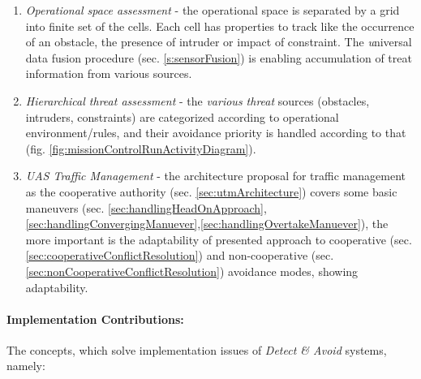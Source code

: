 \begin{enumerate}
    \item \emph{Operational space assessment} - the operational space is separated by a grid into finite set of the cells. Each cell has properties to track like the occurrence of an obstacle, the presence of intruder or impact of constraint. The \emph universal data fusion procedure (sec. \ref{s:sensorFusion}) is enabling accumulation of treat information from various sources.
    
    \item \emph{Hierarchical threat assessment} -  the \emph{various threat} sources (obstacles, intruders, constraints) are categorized according to operational environment/rules, and their avoidance priority is handled according to that (fig. \ref{fig:missionControlRunActivityDiagram}).
    
    \item \emph{UAS Traffic Management} - the architecture proposal for traffic management  as the cooperative authority (sec. \ref{sec:utmArchitecture}) covers some basic maneuvers (sec. \ref{sec:handlingHeadOnApproach}, \ref{sec:handlingConvergingManuever},\ref{sec:handlingOvertakeManuever}), the more important is the adaptability of presented approach to cooperative (sec. \ref{sec:cooperativeConflictResolution}) and non-cooperative (sec. \ref{sec:nonCooperativeConflictResolution}) avoidance modes, showing adaptability. 
\end{enumerate}

\paragraph{Implementation Contributions:} The concepts, which solve implementation issues of \emph{Detect \& Avoid} systems, namely:

